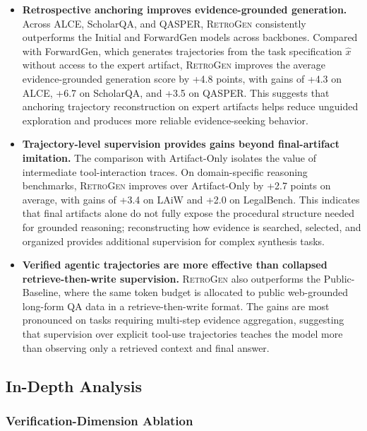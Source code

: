 \begin{itemize}[leftmargin=*]
    \item \textbf{Retrospective anchoring improves evidence-grounded generation.}
Across ALCE, ScholarQA, and QASPER, \textsc{RetroGen} consistently outperforms the Initial and ForwardGen models across backbones. Compared with ForwardGen, which generates trajectories from the task specification $\hat{x}$ without access to the expert artifact, \textsc{RetroGen} improves the average evidence-grounded generation score by +4.8 points, with gains of +4.3 on ALCE, +6.7 on ScholarQA, and +3.5 on QASPER. This suggests that anchoring trajectory reconstruction on expert artifacts helps reduce unguided exploration and produces more reliable evidence-seeking behavior.

\item \textbf{Trajectory-level supervision provides gains beyond final-artifact imitation.}
The comparison with Artifact-Only isolates the value of intermediate tool-interaction traces. On domain-specific reasoning benchmarks, \textsc{RetroGen} improves over Artifact-Only by +2.7 points on average, with gains of +3.4 on LAiW and +2.0 on LegalBench. This indicates that final artifacts alone do not fully expose the procedural structure needed for grounded reasoning; reconstructing how evidence is searched, selected, and organized provides additional supervision for complex synthesis tasks.

    \item \textbf{Verified agentic trajectories are more effective than collapsed retrieve-then-write supervision.}
    \textsc{RetroGen} also outperforms the Public-Baseline, where the same token budget is allocated to public web-grounded long-form QA data in a retrieve-then-write format. The gains are most pronounced on tasks requiring multi-step evidence aggregation, suggesting that supervision over explicit tool-use trajectories teaches the model more than observing only a retrieved context and final answer.
\end{itemize}

\subsection{In-Depth Analysis}

\subsubsection{Verification-Dimension Ablation}
\label{sec:verifier_ablation}

